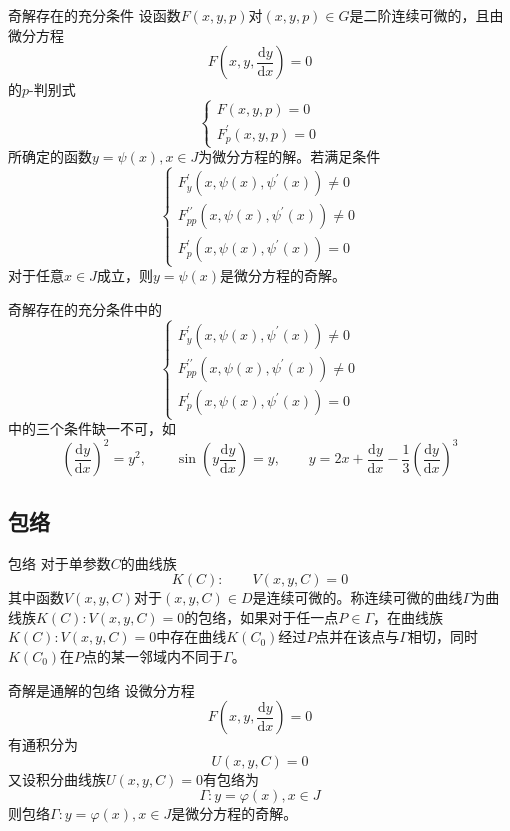 \documentclass[lang = cn, scheme = chinese, thmcnt = section]{elegantbook}
\begin{document}
\begin{theorem}{奇解存在的充分条件}
	设函数$F(x,y,p)$对$(x,y,p)\in G$是二阶连续可微的，且由微分方程
	$$
	F\left(x,y,\frac{\mathrm{d}y}{\mathrm{d}x}\right)=0
	$$
	的$p$-判别式
	$$
	\begin{cases}F(x,y,p)=0\\F_p^{\prime}(x,y,p)=0\end{cases}
	$$
	所确定的函数$y=\psi(x),x\in J$为微分方程的解。若满足条件
	$$
	\begin{cases}F_y^{\prime}(x,\psi(x),\psi^{\prime}(x))\ne 0\\F_{pp}^{\prime\prime}(x,\psi(x),\psi^{\prime}(x))\ne 0\\F_p^{\prime}(x,\psi(x),\psi^{\prime}(x))=0\end{cases}
	$$
	对于任意$x\in J$成立，则$y=\psi(x)$是微分方程的奇解。
\end{theorem}

\begin{note}
	奇解存在的充分条件中的
	$$
	\begin{cases}F_y^{\prime}(x,\psi(x),\psi^{\prime}(x))\ne 0\\F_{pp}^{\prime\prime}(x,\psi(x),\psi^{\prime}(x))\ne 0\\F_p^{\prime}(x,\psi(x),\psi^{\prime}(x))=0\end{cases}
	$$
	中的三个条件缺一不可，如
	$$
	(\frac{\mathrm{d}y}{\mathrm{d}x})^2=y^2,\qquad 
	\sin(y\frac{\mathrm{d}y}{\mathrm{d}x})=y,\qquad 
	y=2x+\frac{\mathrm{d}y}{\mathrm{d}x}-\frac{1}{3}(\frac{\mathrm{d}y}{\mathrm{d}x})^3
	$$
\end{note}

\subsection{包络}

\begin{definition}{包络}
	对于单参数$C$的曲线族
	$$
	K(C):\qquad V(x,y,C)=0
	$$
	其中函数$V(x,y,C)$对于$(x,y,C)\in D$是连续可微的。称连续可微的曲线$\Gamma$为曲线族$K(C):V(x,y,C)=0$的包络，如果对于任一点$P\in\Gamma$，在曲线族$K(C):V(x,y,C)=0$中存在曲线$K(C_0)$经过$P$点并在该点与$\Gamma$相切，同时$K(C_0)$在$P$点的某一邻域内不同于$\Gamma$。
\end{definition}

\begin{theorem}{奇解是通解的包络}
	设微分方程
	$$
	F(x,y,\frac{\mathrm{d}y}{\mathrm{d}x})=0
	$$
	有通积分为
	$$
	U(x,y,C)=0
	$$
	又设积分曲线族$U(x,y,C)=0$有包络为
	$$
	\Gamma:y=\varphi(x),x\in J
	$$
	则包络$\Gamma:y=\varphi(x),x\in J$是微分方程的奇解。
\end{theorem}
\end{document}
